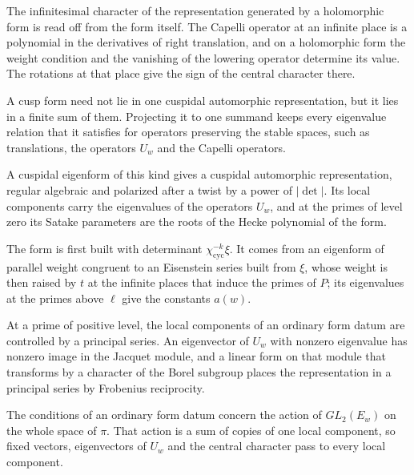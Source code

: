 The infinitesimal character of the representation generated by a holomorphic form is read off from the form itself. The Capelli operator at an infinite place is a polynomial in the derivatives of right translation, and on a holomorphic form the weight condition and the vanishing of the lowering operator determine its value. The rotations at that place give the sign of the central character there.

A cusp form need not lie in one cuspidal automorphic representation, but it lies in a finite sum of them. Projecting it to one summand keeps every eigenvalue relation that it satisfies for operators preserving the stable spaces, such as translations, the operators $U_w$ and the Capelli operators.

A cuspidal eigenform of this kind gives a cuspidal automorphic representation, regular algebraic and polarized after a twist by a power of $|\det|$. Its local components carry the eigenvalues of the operators $U_w$, and at the primes of level zero its Satake parameters are the roots of the Hecke polynomial of the form.

The form is first built with determinant $\chi_{\mathrm{cyc}}^{-k}\xi$. It comes from an eigenform of parallel weight congruent to an Eisenstein series built from $\xi$, whose weight is then raised by $t$ at the infinite places that induce the primes of $P$; its eigenvalues at the primes above $\ell$ give the constants $a(w)$.

At a prime of positive level, the local components of an ordinary form datum are controlled by a principal series. An eigenvector of $U_w$ with nonzero eigenvalue has nonzero image in the Jacquet module, and a linear form on that module that transforms by a character of the Borel subgroup places the representation in a principal series by Frobenius reciprocity.

The conditions of an ordinary form datum concern the action of $GL_2(E_w)$ on the whole space of $\pi$. That action is a sum of copies of one local component, so fixed vectors, eigenvectors of $U_w$ and the central character pass to every local component.

